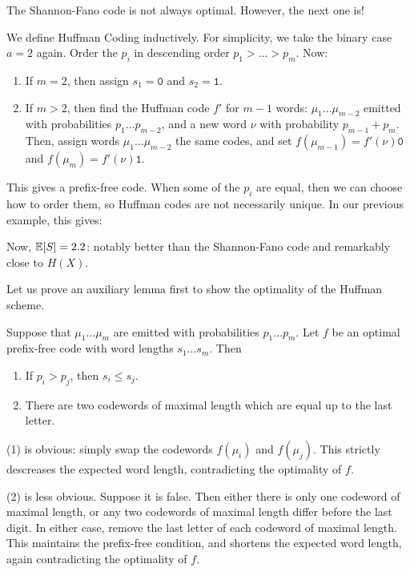 \documentclass{article}
\begin{document}
\begin{note}
	The Shannon-Fano code is not always optimal. However, the next one is!
\end{note}

\begin{example}
    We define Huffman Coding inductively. For simplicity, we take the binary case $a = 2$ again. Order the $p_i$ in descending order $p_1 > \dots > p_m$. Now:
    \begin{enumerate}
    	\item If $m=2$, then assign $s_1 = \texttt{0}$ and $s_2 = \texttt{1}$.
    	\item If $m>2$, then find the Huffman code $f'$ for $m-1$ words: $\mu_1 \dots \mu_{m-2}$ emitted with probabilities $p_1 \dots p_{m-2}$, and a new word $\nu$ with probability $p_{m-1} + p_m$. Then, assign words $\mu_1 \dots \mu_{m-2}$ the same codes, and set $f(\mu_{m-1}) = f'(\nu)\texttt{0}$ and $f(\mu_{m}) = f'(\nu)\texttt{1}$.
	\end{enumerate}
	This gives a prefix-free code. When some of the $p_i$ are equal, then we can choose how to order them, so Huffman codes are not necessarily unique. In our previous example, this gives:
	
	
	Now, $\mathbb{E}[S] = 2.2$: notably better than the Shannon-Fano code and remarkably close to $H(X)$.
\end{example}

Let us prove an auxiliary lemma first to show the optimality of the Huffman scheme.

\begin{proposition}
	\label{sorting-and-almost-equality}
    Suppose that $\mu_1 \dots \mu_m$ are emitted with probabilities $p_1 \dots p_m$. Let $f$ be an optimal prefix-free code with word lengths $s_1 \dots s_m$. Then
    \begin{enumerate}
	    \item If $p_i > p_j$, then $s_i \leq s_j$.
	    \item There are two codewords of maximal length which are equal up to the last letter.
	\end{enumerate}
\end{proposition}
\begin{prf}
    (1) is obvious: simply swap the codewords $f(\mu_i)$ and $f(\mu_j)$. This strictly descreases the expected word length, contradicting the optimality of $f$.
    
    (2) is less obvious. Suppose it is false. Then either there is only one codeword of maximal length, or any two codewords of maximal length differ before the last digit. In either case, remove the last letter of each codeword of maximal length. This maintains the prefix-free condition, and shortens the expected word length, again contradicting the optimality of $f$.
\end{prf}
\end{document}
